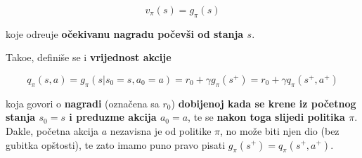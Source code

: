 \documentclass[12pt]{IEEEtran}
\numberwithin{equation}{subsection}
\numberwithin{figure}{subsection}
\theoremstyle{definition}
\numberwithin{example}{section}
\begin{document}
\begin{equation}
    v_{\pi}(s) = g_{\pi}(s)
\end{equation}

koje odre\dj{}uje \textbf{o\v{c}ekivanu nagradu po\v{c}ev\v{s}i od
    stanja $s$}.

Tako\dj{}e, defini\v{s}e se i \textbf{vrijednost akcije}

\begin{equation}
    q_{\pi}(s, a) = g_{\pi}(s | s_{0} = s, a_{0} = a) = r_{0} + \gamma g_{\pi}(s^{+}) = r_{0} + \gamma q_{\pi}(s^{+}, a^{+})
\end{equation}

koja govori o \textbf{nagradi} (ozna\v{c}ena
sa $r_{0}$) \textbf{dobijenoj kada se krene iz po\v{c}etnog
stanja $s_{0} = s$ i preduzme akcija $a_{0} = a$}, te se \textbf{nakon toga slijedi politika $\pi$}.
Dakle, po\v{c}etna akcija $a$ nezavisna je od politike $\pi$,
no mo\v{z}e biti njen dio (bez gubitka op\v{s}tosti), te zato imamo puno pravo pisati 
$g_{\pi}(s^{+}) = q_{\pi}(s^{+}, a^{+})$.
\end{document}
